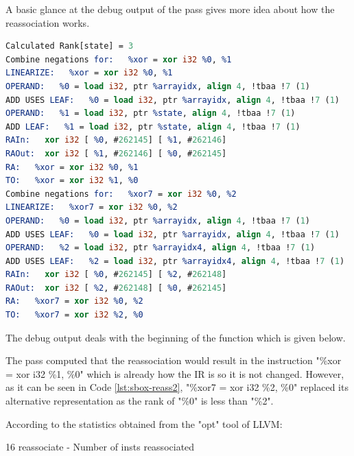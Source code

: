



A basic glance at the debug output of the pass gives more idea about how the reassociation works.

\begin{lstlisting}[language=llvm, style=nasm]
Calculated Rank[state] = 3
Combine negations for:   %xor = xor i32 %0, %1
LINEARIZE:   %xor = xor i32 %0, %1
OPERAND:   %0 = load i32, ptr %arrayidx, align 4, !tbaa !7 (1)
ADD USES LEAF:   %0 = load i32, ptr %arrayidx, align 4, !tbaa !7 (1)
OPERAND:   %1 = load i32, ptr %state, align 4, !tbaa !7 (1)
ADD LEAF:   %1 = load i32, ptr %state, align 4, !tbaa !7 (1)
RAIn:	xor i32	[ %0, #262145] [ %1, #262146]
RAOut:	xor i32	[ %1, #262146] [ %0, #262145]
RA:   %xor = xor i32 %0, %1
TO:   %xor = xor i32 %1, %0
Combine negations for:   %xor7 = xor i32 %0, %2
LINEARIZE:   %xor7 = xor i32 %0, %2
OPERAND:   %0 = load i32, ptr %arrayidx, align 4, !tbaa !7 (1)
ADD USES LEAF:   %0 = load i32, ptr %arrayidx, align 4, !tbaa !7 (1)
OPERAND:   %2 = load i32, ptr %arrayidx4, align 4, !tbaa !7 (1)
ADD USES LEAF:   %2 = load i32, ptr %arrayidx4, align 4, !tbaa !7 (1)
RAIn:	xor i32	[ %0, #262145] [ %2, #262148]
RAOut:	xor i32	[ %2, #262148] [ %0, #262145]
RA:   %xor7 = xor i32 %0, %2
TO:   %xor7 = xor i32 %2, %0
\end{lstlisting}

The debug output deals with the beginning of the function which is given below.



The pass computed that the reassociation would result in the instruction "\%xor = xor i32 \%1, \%0" which is already how the IR is so it is not changed. However, as it can be seen in Code \ref{lst:sbox-reass2}, "\%xor7 = xor i32 \%2, \%0" replaced its alternative representation as the rank of "\%0" is less than "\%2". 


According to the statistics obtained from the "opt" tool of LLVM:
\begin{displayquote}
    16 reassociate - Number of insts reassociated
\end{displayquote}


